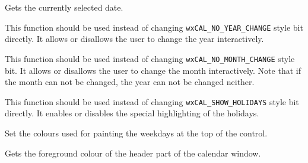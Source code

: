 
Gets the currently selected date.


\label{wxcalendarctrlenableyearchange}


This function should be used instead of changing {\tt wxCAL\_NO\_YEAR\_CHANGE}
style bit directly. It allows or disallows the user to change the year
interactively.


\label{wxcalendarctrlenablemonthchange}


This function should be used instead of changing 
{\tt wxCAL\_NO\_MONTH\_CHANGE} style bit. It allows or disallows the user to
change the month interactively. Note that if the month can not be changed, the
year can not be changed neither.


\label{wxcalendarctrlenableholidaydisplay}


This function should be used instead of changing {\tt wxCAL\_SHOW\_HOLIDAYS}
style bit directly. It enables or disables the special highlighting of the
holidays.


\label{wxcalendarctrlsetheadercolours}


Set the colours used for painting the weekdays at the top of the control.


\label{wxcalendarctrlgetheadercolourfg}


Gets the foreground colour of the header part of the calendar window.




\label{wxcalendarctrlgetheadercolourbg}


